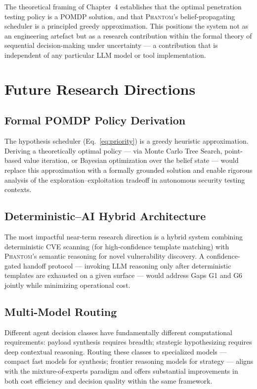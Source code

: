 \documentclass[12pt,a4paper,oneside,openany]{book}
\newcommand{\Phantom}{\textsc{Phantom}}
\begin{document}
The theoretical framing of Chapter~4 establishes that the optimal penetration testing policy is a POMDP solution, and that \Phantom{}'s belief-propagating scheduler is a principled greedy approximation. This positions the system not as an engineering artefact but as a research contribution within the formal theory of sequential decision-making under uncertainty --- a contribution that is independent of any particular LLM model or tool implementation.

\section{Future Research Directions}

\subsection{Formal POMDP Policy Derivation}

The hypothesis scheduler (Eq.~\ref{eq:priority}) is a greedy heuristic approximation. Deriving a theoretically optimal policy --- via Monte Carlo Tree Search, point-based value iteration, or Bayesian optimization over the belief state --- would replace this approximation with a formally grounded solution and enable rigorous analysis of the exploration--exploitation tradeoff in autonomous security testing contexts.

\subsection{Deterministic--AI Hybrid Architecture}

The most impactful near-term research direction is a hybrid system combining deterministic CVE scanning (for high-confidence template matching) with \Phantom{}'s semantic reasoning for novel vulnerability discovery. A confidence-gated handoff protocol --- invoking LLM reasoning only after deterministic templates are exhausted on a given surface --- would address Gaps G1 and G6 jointly while minimizing operational cost.

\subsection{Multi-Model Routing}

Different agent decision classes have fundamentally different computational requirements: payload synthesis requires breadth; strategic hypothesizing requires deep contextual reasoning. Routing these classes to specialized models --- compact fast models for synthesis; frontier reasoning models for strategy --- aligns with the mixture-of-experts paradigm and offers substantial improvements in both cost efficiency and decision quality within the same framework.
\end{document}
